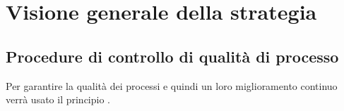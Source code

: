 
\section{Visione generale della strategia}

\subsection{Procedure di controllo di qualità di processo}
Per garantire la qualità dei processi e quindi un loro miglioramento continuo verrà usato il principio .

\label{sec:Misure}